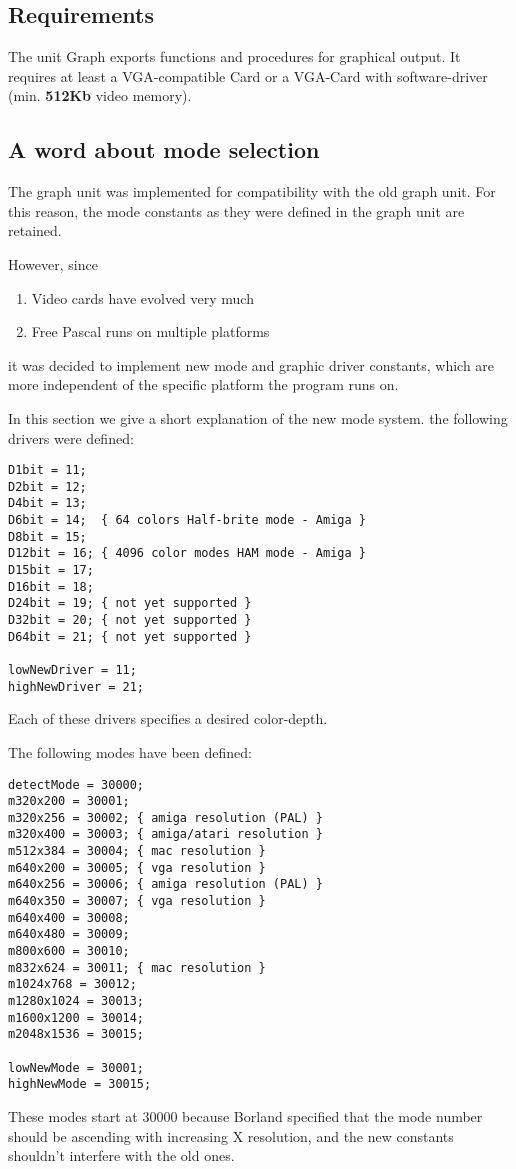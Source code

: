 \subsection{Requirements}
The unit Graph exports functions and procedures for graphical output.
It requires at least a VGA-compatible Card or a VGA-Card with software-driver
(min. \textbf{512Kb} video memory).
\subsection{A word about mode selection}
The graph unit was implemented for compatibility with the old \tp graph
unit. For this reason, the mode constants as they were defined in the
\tp graph unit are retained. 

However, since
\begin{enumerate}
\item Video cards have evolved very much
\item Free Pascal runs on multiple platforms
\end{enumerate}
it was decided to implement new mode and graphic driver constants, 
which are more independent of the specific platform the program runs on.

In this section we give a short explanation of the new mode system. the
following drivers were defined:
\begin{verbatim}
D1bit = 11;
D2bit = 12;
D4bit = 13;
D6bit = 14;  { 64 colors Half-brite mode - Amiga }
D8bit = 15;
D12bit = 16; { 4096 color modes HAM mode - Amiga }
D15bit = 17;
D16bit = 18;
D24bit = 19; { not yet supported }
D32bit = 20; { not yet supported }
D64bit = 21; { not yet supported }

lowNewDriver = 11;
highNewDriver = 21;
\end{verbatim}
Each of these drivers specifies a desired color-depth. 

The following modes have been defined:
\begin{verbatim}
detectMode = 30000;
m320x200 = 30001;  
m320x256 = 30002; { amiga resolution (PAL) }
m320x400 = 30003; { amiga/atari resolution }
m512x384 = 30004; { mac resolution }
m640x200 = 30005; { vga resolution }
m640x256 = 30006; { amiga resolution (PAL) }
m640x350 = 30007; { vga resolution }
m640x400 = 30008;
m640x480 = 30009;
m800x600 = 30010;
m832x624 = 30011; { mac resolution }
m1024x768 = 30012;
m1280x1024 = 30013;
m1600x1200 = 30014;
m2048x1536 = 30015;

lowNewMode = 30001;
highNewMode = 30015;
\end{verbatim}
These modes start at 30000 because Borland specified that the mode number
should be ascending with increasing X resolution, and the new constants 
shouldn't interfere with the old ones.

